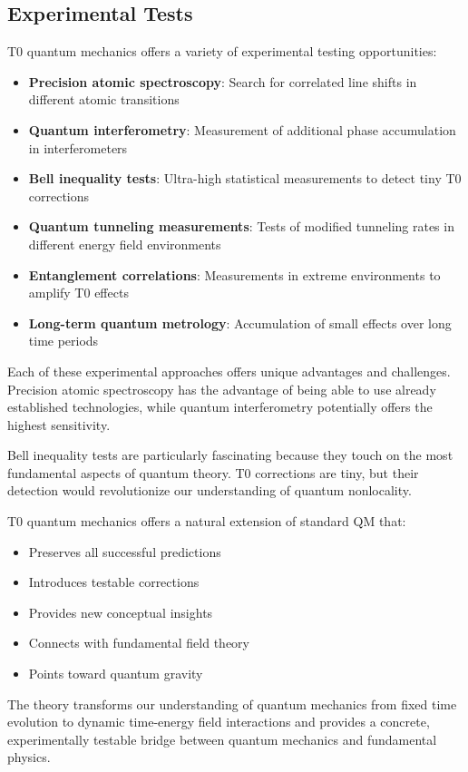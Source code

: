 \documentclass[12pt,a4paper]{article}
\theoremstyle{definition}
\theoremstyle{remark}
\begin{document}
\subsection{Experimental Tests}

T0 quantum mechanics offers a variety of experimental testing opportunities:

\begin{itemize}
	\item \textbf{Precision atomic spectroscopy}: Search for correlated line shifts in different atomic transitions
	\item \textbf{Quantum interferometry}: Measurement of additional phase accumulation in interferometers
	\item \textbf{Bell inequality tests}: Ultra-high statistical measurements to detect tiny T0 corrections
	\item \textbf{Quantum tunneling measurements}: Tests of modified tunneling rates in different energy field environments
	\item \textbf{Entanglement correlations}: Measurements in extreme environments to amplify T0 effects
	\item \textbf{Long-term quantum metrology}: Accumulation of small effects over long time periods
\end{itemize}

Each of these experimental approaches offers unique advantages and challenges. Precision atomic spectroscopy has the advantage of being able to use already established technologies, while quantum interferometry potentially offers the highest sensitivity.

Bell inequality tests are particularly fascinating because they touch on the most fundamental aspects of quantum theory. T0 corrections are tiny, but their detection would revolutionize our understanding of quantum nonlocality.

\begin{tcolorbox}[colback=green!5!white,colframe=green!75!black,title=Conclusion]
	T0 quantum mechanics offers a natural extension of standard QM that:
	\begin{itemize}
		\item Preserves all successful predictions
		\item Introduces testable corrections
		\item Provides new conceptual insights
		\item Connects with fundamental field theory
		\item Points toward quantum gravity
	\end{itemize}
	
	The theory transforms our understanding of quantum mechanics from fixed time evolution to dynamic time-energy field interactions and provides a concrete, experimentally testable bridge between quantum mechanics and fundamental physics.
\end{tcolorbox}
\end{document}
